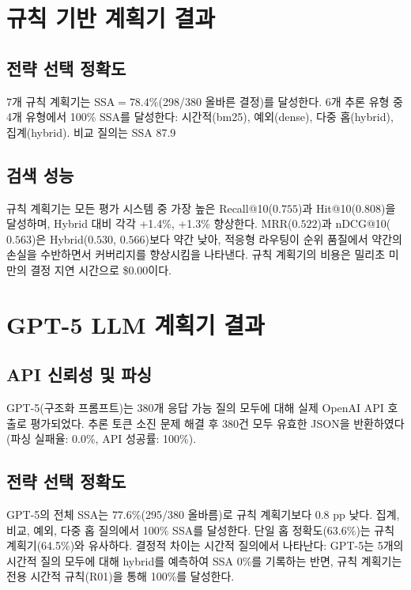 \FloatBarrier
\section{규칙 기반 계획기 결과}
\label{sec:results_rule_ko}

\subsection{전략 선택 정확도}

7개 규칙 계획기는 SSA$={78.4\%}$(298/380 올바른 결정)를 달성한다. 6개 추론 유형 중 4개 유형에서 100\% SSA를 달성한다: 시간적(bm25), 예외(dense), 다중 홉(hybrid), 집계(hybrid). 비교 질의는 SSA 87.9%

\subsection{검색 성능}

규칙 계획기는 모든 평가 시스템 중 가장 높은 Recall@10($0.755$)과 Hit@10($0.808$)을 달성하며, Hybrid 대비 각각 +1.4\%, +1.3\% 향상한다. MRR($0.522$)과 nDCG@10($0.563$)은 Hybrid($0.530$, $0.566$)보다 약간 낮아, 적응형 라우팅이 순위 품질에서 약간의 손실을 수반하면서 커버리지를 향상시킴을 나타낸다. 규칙 계획기의 비용은 밀리초 미만의 결정 지연 시간으로 \$0.00이다.

\FloatBarrier
\section{GPT-5 LLM 계획기 결과}
\label{sec:results_gpt5_ko}

\subsection{API 신뢰성 및 파싱}

GPT-5(구조화 프롬프트)는 380개 응답 가능 질의 모두에 대해 실제 OpenAI API 호출로 평가되었다. 추론 토큰 소진 문제 해결 후 380건 모두 유효한 JSON을 반환하였다(파싱 실패율: 0.0\%, API 성공률: 100\%).

\subsection{전략 선택 정확도}

GPT-5의 전체 SSA는 $77.6\%$(295/380 올바름)로 규칙 계획기보다 0.8 pp 낮다. 집계, 비교, 예외, 다중 홉 질의에서 100\% SSA를 달성한다. 단일 홉 정확도(63.6\%)는 규칙 계획기(64.5\%)와 유사하다. 결정적 차이는 시간적 질의에서 나타난다: GPT-5는 5개의 시간적 질의 모두에 대해 hybrid를 예측하여 SSA 0\%를 기록하는 반면, 규칙 계획기는 전용 시간적 규칙(R01)을 통해 100\%를 달성한다.


